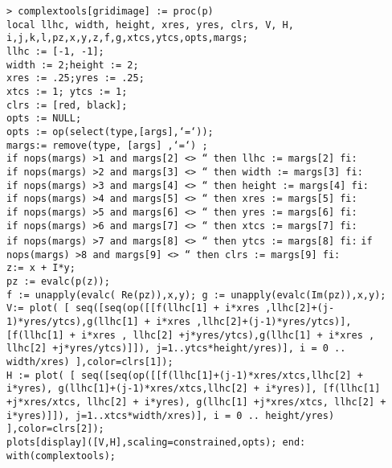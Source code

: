 \begin{tcolorbox}[colframe=black,colback=white,sharp corners,breakable]
\texttt{> complextools[gridimage] := proc(p)\\
local llhc, width, height, xres, yres, clrs, V, H, i,j,k,l,pz,x,y,z,f,g,xtcs,ytcs,opts,margs;\\
llhc := [-1, -1];\\
width := 2;height := 2;\\
xres := .25;yres := .25;\\
xtcs := 1; ytcs := 1;\\
clrs := [red, black];\\
opts := NULL;\\
opts := op(select(type,[args],`=`));\\
margs:= remove(type, [args] ,`=`) ;\\
if nops(margs) >1 and margs[2] <> `` then llhc := margs[2] fi:\\
if nops(margs) >2 and margs[3] <> `` then width := margs[3] fi:\\
if nops(margs) >3 and margs[4] <> `` then height := margs[4] fi:\\
if nops(margs) >4 and margs[5] <> `` then xres := margs[5] fi:\\
if nops(margs) >5 and margs[6] <> `` then yres := margs[6] fi:\\
if nops(margs) >6 and margs[7] <> `` then xtcs := margs[7] fi:\\
if nops(margs) >7 and margs[8] <> `` then ytcs := margs[8] fi:}
\texttt{if nops(margs) >8 and margs[9] <> `` then clrs := margs[9] fi:\\
z:= x + I*y;\\
pz := evalc(p(z));\\
f := unapply(evalc( Re(pz)),x,y); g := unapply(evalc(Im(pz)),x,y);\\
V:= plot( [
seq([seq(op([[f(llhc[1] + i*xres ,llhc[2]+(j-1)*yres/ytcs),g(llhc[1] + i*xres ,llhc[2]+(j-1)*yres/ytcs)], [f(llhc[1] + i*xres , llhc[2] +j*yres/ytcs),g(llhc[1] + i*xres , llhc[2] +j*yres/ytcs)]]),
j=1..ytcs*height/yres)], i = 0 .. width/xres)
],color=clrs[1]);\\
H := plot( [
seq([seq(op([[f(llhc[1]+(j-1)*xres/xtcs,llhc[2] + i*yres),
g(llhc[1]+(j-1)*xres/xtcs,llhc[2] + i*yres)], 
[f(llhc[1] +j*xres/xtcs, llhc[2] + i*yres),
g(llhc[1] +j*xres/xtcs, llhc[2] + i*yres)]]),
j=1..xtcs*width/xres)], i = 0 .. height/yres)
],color=clrs[2]);\\
plots[display]([V,H],scaling=constrained,opts);
end:\\
with(complextools);}\\


\end{tcolorbox}
